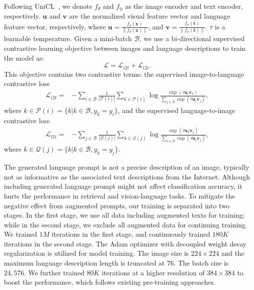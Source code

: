 \documentclass{article}
\begin{document}
Following UniCL~\cite{Jianwei_UNICL2022}, we denote $f_{\theta}$ and $f_{\phi}$ as the image encoder and text encoder, respectively.
$\boldsymbol{u}$ and $\boldsymbol{v}$ are the normalized visual feature vector and language feature
vector, respectively, where $\boldsymbol{u} =
\frac{f_{\theta}(\boldsymbol{x})}{\|f_{\theta}(\boldsymbol{x})\|}$, and $\boldsymbol{v} =
\frac{f_{\phi}(\boldsymbol{t})}{\|f_{\phi}(\boldsymbol{t})\|}$. $\tau$ is a learnable temperature.
Given a mini-batch $\mathcal{B}$, we use a bi-directional supervised contrastive learning objective
between images and language descriptions to train the model as:
\begin{equation}\label{eq:obj_bicon}
	\mathcal{L} 	=  \mathcal{L}_{i2t} + \mathcal{L}_{t2i}.
\end{equation}
This objective contains two contrastive terms: the supervised image-to-language contrastive loss
\begin{align}\label{eq:obj_i2t_label}
\mathcal{L}_{i2t}	= & - \sum_{ i \in \mathcal{B} } \frac{1}{ |\mathcal{P}(i)|  }  \sum_{ k \in
\mathcal{P}(i) }
\log \frac{ \exp(\tau\boldsymbol{u}_{i} \boldsymbol{v}_k )  }{\sum_{ j \in \mathcal{B}}
\exp(\tau\boldsymbol{u}_{i} \boldsymbol{v}_{j} )  },
\end{align}
where $k \in \mathcal{P}(i) = \{ k | k \in \mathcal{B}, y_k = y_i\}$, and the supervised
language-to-image contrastive loss
\begin{align}\label{eq:obj_t2i_label}
\mathcal{L}_{t2i}	= & - \sum_{ j \in \mathcal{B} } \frac{1}{ |\mathcal{Q}(j)|  }  \sum_{ k \in
\mathcal{Q}(j) }
\log \frac{ \exp(\tau\boldsymbol{u}_{k} \boldsymbol{v}_j )  }{\sum_{ i \in \mathcal{B}}
\exp(\tau\boldsymbol{u}_{i} \boldsymbol{v}_{j} )  },
\end{align}
where $k \in \mathcal{Q}(j) = \{ k | k \in \mathcal{B}, y_k = y_j\} $.

The generated language prompt is not a precise description of an image, typically not as informative as the associated text descriptions from the Internet. Although including generated language prompt might not affect classification accuracy, it hurts the performance in retrieval and vision-language tasks. To mitigate the negative effect from augmented prompts, our training is separated into two stages. In the first stage, we use
all data including augmented texts for training; while in the second stage, we exclude all augmented
data for continuing training. We trained $1M$ iterations in the first stage, and continuously
trained $180K$ iterations in the second stage. The Adam optimizer with decoupled weight decay
regularization is utilized for model training. The image size is $224\times224$ and the maximum
language description length is truncated at $76$. The batch size is $24,576$. We further trained
$80K$ iterations at a higher resolution of $384\times384$ to boost the performance, which follows
existing pre-training approaches.
\end{document}
